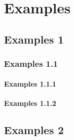 \chapter{Examples}
\section{Examples 1}
\subsection{Examples 1.1}
\subsubsection{Examples 1.1.1}
\lipsum
\subsubsection{Examples 1.1.2}
\lipsum
\section{Examples 2}
\lipsum